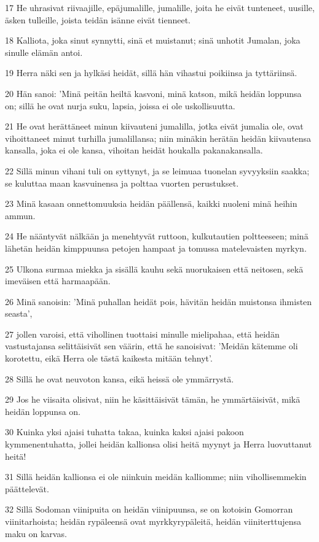 \par 17 He uhrasivat riivaajille, epäjumalille, jumalille, joita he eivät tunteneet, uusille, äsken tulleille, joista teidän isänne eivät tienneet.
\par 18 Kalliota, joka sinut synnytti, sinä et muistanut; sinä unhotit Jumalan, joka sinulle elämän antoi.
\par 19 Herra näki sen ja hylkäsi heidät, sillä hän vihastui poikiinsa ja tyttäriinsä.
\par 20 Hän sanoi: 'Minä peitän heiltä kasvoni, minä katson, mikä heidän loppunsa on; sillä he ovat nurja suku, lapsia, joissa ei ole uskollisuutta.
\par 21 He ovat herättäneet minun kiivauteni jumalilla, jotka eivät jumalia ole, ovat vihoittaneet minut turhilla jumalillansa; niin minäkin herätän heidän kiivautensa kansalla, joka ei ole kansa, vihoitan heidät houkalla pakanakansalla.
\par 22 Sillä minun vihani tuli on syttynyt, ja se leimuaa tuonelan syvyyksiin saakka; se kuluttaa maan kasvuinensa ja polttaa vuorten perustukset.
\par 23 Minä kasaan onnettomuuksia heidän päällensä, kaikki nuoleni minä heihin ammun.
\par 24 He nääntyvät nälkään ja menehtyvät ruttoon, kulkutautien poltteeseen; minä lähetän heidän kimppuunsa petojen hampaat ja tomussa matelevaisten myrkyn.
\par 25 Ulkona surmaa miekka ja sisällä kauhu sekä nuorukaisen että neitosen, sekä imeväisen että harmaapään.
\par 26 Minä sanoisin: 'Minä puhallan heidät pois, hävitän heidän muistonsa ihmisten seasta',
\par 27 jollen varoisi, että vihollinen tuottaisi minulle mielipahaa, että heidän vastustajansa selittäisivät sen väärin, että he sanoisivat: 'Meidän kätemme oli korotettu, eikä Herra ole tästä kaikesta mitään tehnyt'.
\par 28 Sillä he ovat neuvoton kansa, eikä heissä ole ymmärrystä.
\par 29 Jos he viisaita olisivat, niin he käsittäisivät tämän, he ymmärtäisivät, mikä heidän loppunsa on.
\par 30 Kuinka yksi ajaisi tuhatta takaa, kuinka kaksi ajaisi pakoon kymmenentuhatta, jollei heidän kallionsa olisi heitä myynyt ja Herra luovuttanut heitä!
\par 31 Sillä heidän kallionsa ei ole niinkuin meidän kalliomme; niin vihollisemmekin päättelevät.
\par 32 Sillä Sodoman viinipuita on heidän viinipuunsa, se on kotoisin Gomorran viinitarhoista; heidän rypäleensä ovat myrkkyrypäleitä, heidän viiniterttujensa maku on karvas.
